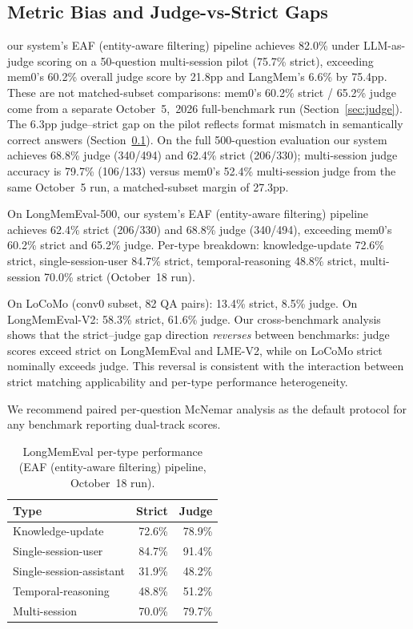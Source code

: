 \documentclass{llncs}
\begin{document}
\subsection{Metric Bias and Judge-vs-Strict Gaps}
\label{sec:metric_bias}
our system's EAF (entity-aware filtering) pipeline achieves 82.0\% under LLM-as-judge scoring on a 50-question multi-session pilot (75.7\% strict), exceeding mem0's 60.2\% overall judge score by 21.8pp and LangMem's 6.6\% by 75.4pp. These are not matched-subset comparisons: mem0's 60.2\% strict / 65.2\% judge come from a separate October~5,~2026 full-benchmark run (Section~\ref{sec:judge}). The 6.3pp judge--strict gap on the pilot reflects format mismatch in semantically correct answers (Section~\ref{sec:metric_bias}). On the full 500-question evaluation our system achieves 68.8\% judge (340/494) and 62.4\% strict (206/330); multi-session judge accuracy is 79.7\% (106/133) versus mem0's 52.4\% multi-session judge from the same October~5 run, a matched-subset margin of 27.3pp.

On LongMemEval-500, our system's EAF (entity-aware filtering) pipeline achieves 62.4\% strict (206/330) and 68.8\% judge (340/494), exceeding mem0's 60.2\% strict and 65.2\% judge. Per-type breakdown: knowledge-update 72.6\% strict, single-session-user 84.7\% strict, temporal-reasoning 48.8\% strict, multi-session 70.0\% strict (October~18 run).

On LoCoMo (conv0 subset, 82 QA pairs): 13.4\% strict, 8.5\% judge. On LongMemEval-V2: 58.3\% strict, 61.6\% judge. Our cross-benchmark analysis shows that the strict--judge gap direction \emph{reverses} between benchmarks: judge scores exceed strict on LongMemEval and LME-V2, while on LoCoMo strict nominally exceeds judge. This reversal is consistent with the interaction between strict matching applicability and per-type performance heterogeneity.

We recommend paired per-question McNemar analysis as the default protocol for any benchmark reporting dual-track scores.

\begin{table}[h]
\centering
\caption{LongMemEval per-type performance (EAF (entity-aware filtering) pipeline, October~18 run).}
\begin{tabular}{lrr}
\toprule
Type & Strict & Judge \\
\midrule
Knowledge-update & 72.6\% & 78.9\% \\
Single-session-user & 84.7\% & 91.4\% \\
Single-session-assistant & 31.9\% & 48.2\% \\
Temporal-reasoning & 48.8\% & 51.2\% \\
Multi-session & 70.0\% & 79.7\% \\
\bottomrule
\end{tabular}
\end{table}
\end{document}
